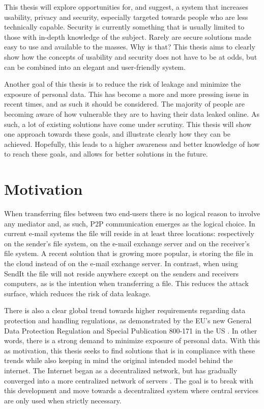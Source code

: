 This thesis will explore opportunities for, and suggest, a system that increases usability, privacy and security, especially targeted towards people who are less technically capable. Security is currently something that is usually limited to those with in-depth knowledge of the subject. Rarely are secure solutions made easy to use and available to the masses. Why is that? This thesis aims to clearly show how the concepts of usability and security does not have to be at odds, but can be combined into an elegant and user-friendly system.

Another goal of this thesis is to reduce the risk of leakage and minimize the exposure of personal data. This has become a more and more pressing issue in recent times, and as such it should be considered. The majority of people are becoming aware of how vulnerable they are to having their data leaked online. As such, a lot of existing solutions have come under scrutiny. This thesis will show one approach towards these goals, and illustrate clearly how they can be achieved. Hopefully, this leads to a higher awareness and better knowledge of how to reach these goals, and allows for better solutions in the future.

%
\section{Motivation}
\label{sec:motivation}
%
When transferring files between two end-users there is no logical reason to involve any mediator and, as such, P2P communication emerges as the logical choice. In current e-mail systems the file will reside in at least three locations: respectively on the sender's file system, on the e-mail exchange server and on the receiver's file system. A recent solution that is growing more popular, is storing the file in the cloud instead of on the e-mail exchange server. In contrast, when using SendIt the file will not reside anywhere except on the senders and receivers computers, as is the intention when transferring a file. This reduces the attack surface, which reduces the risk of data leakage.

There is also a clear global trend towards higher requirements regarding data protection and handling regulations, as demonstrated by the EU's new General Data Protection Regulation \cite{law_gdpr,ar_gdpr} and Special Publication 800-171 in the US \cite{law_sp800}. In other words, there is a strong demand to minimize exposure of personal data. With this as motivation, this thesis seeks to find solutions that is in compliance with these trends while also keeping in mind the original intended model behind the internet. The Internet began as a decentralized network, but has gradually converged into a more centralized network of servers \cite{ar_decent}. The goal is to break with this development and move towards a decentralized system where central services are only used when strictly necessary.

